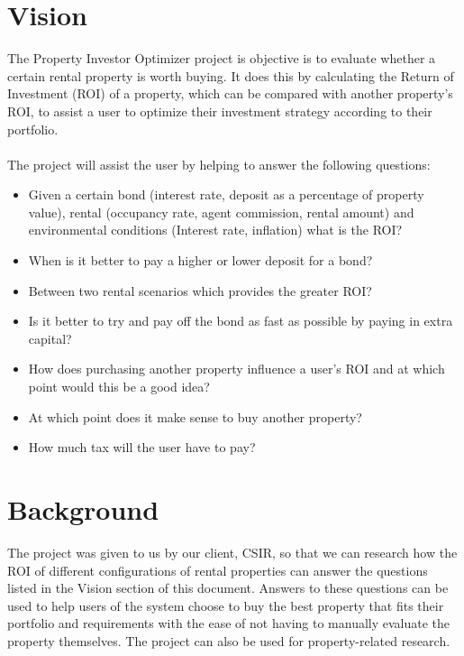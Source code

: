 \documentclass[a4paper,12pt]{article}
\begin{document}
\section{Vision}
The Property Investor Optimizer project is objective is to evaluate whether a certain rental property is worth buying. It does this by calculating the Return of Investment (ROI) of a property, which can be compared with another property's ROI, to assist a user to optimize their investment strategy according to their portfolio.\\\\
The project will assist the user by helping to answer the following questions:\begin{itemize}
	\item Given a certain bond (interest rate, deposit as a percentage of property value), rental (occupancy rate, agent commission, rental amount) and environmental conditions (Interest rate, inflation) what is the ROI?
	\item When is it better to pay a higher or lower deposit for a bond?
	\item Between two rental scenarios which provides the greater ROI?
	\item Is it better to try and pay off the bond as fast as possible by paying in extra capital?
	\item How does purchasing another property influence a user's ROI and at which point would this be a good idea?
	\item At which point does it make sense to buy another property?
	\item How much tax will the user have to pay?

\end{itemize}
\newpage
\section{Background}
The project was given to us by our client, CSIR, so that we can research how the ROI of different configurations of rental properties can answer the questions listed in the Vision section of this document. Answers to these questions can be used to help users of the system choose to buy the best property that fits their portfolio and requirements with the ease of not having to manually evaluate the property themselves. The project can also be used for property-related research.


\end{document}
